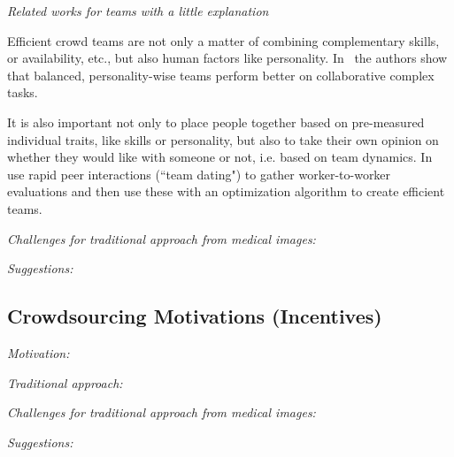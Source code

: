 \documentclass[10pt,twocolumn,letterpaper]{article}
\begin{document}
\emph{Related works for teams with a little explanation}

\cite{Anagnostopoulos2012}

\cite{BalkesenATO13}

Efficient crowd teams are not only a matter of combining complementary skills, or availability, etc., but also human factors like personality. In~\cite{Lykourentzou:2016:PMB:2818048.2819979} the authors show that balanced, personality-wise teams perform better on collaborative complex tasks. 

It is also important not only to place people together based on pre-measured individual traits, like skills or personality, but also to take their own opinion on whether they would like with someone or not, i.e. based on team dynamics. In~\cite{Lykourentzou:2017:TDL:2998181.2998322} use rapid peer interactions (``team dating") to gather worker-to-worker evaluations and then use these with an optimization algorithm to create efficient teams.



\emph{Challenges for traditional approach from medical images:}

\emph{Suggestions:}


\subsection{Crowdsourcing Motivations (Incentives)}
\emph{Motivation:} 

\emph{Traditional approach:}

\emph{Challenges for traditional approach from medical images:}

\emph{Suggestions:}
\end{document}
